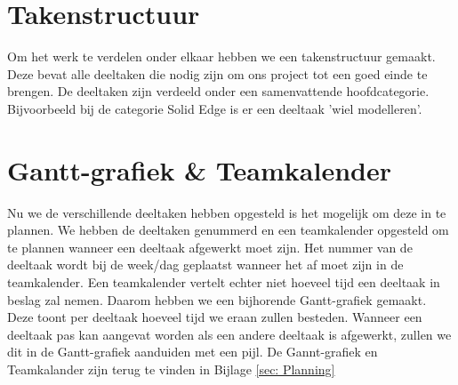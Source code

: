 \documentclass[a4paper,twoside,kulak]{kulakreport}
\begin{document}
	\section*{Takenstructuur}Om het werk te verdelen onder elkaar hebben we een takenstructuur gemaakt. Deze bevat alle deeltaken die nodig zijn om ons project tot een goed einde te brengen. De deeltaken zijn verdeeld onder een samenvattende hoofdcategorie. Bijvoorbeeld bij de categorie Solid Edge is er een deeltaak 'wiel modelleren'. 
	\section*{Gantt-grafiek \& Teamkalender} Nu we de verschillende deeltaken hebben opgesteld is het mogelijk om deze in te plannen. We hebben de deeltaken genummerd en een teamkalender opgesteld om te plannen wanneer een deeltaak afgewerkt moet zijn. Het nummer van de deeltaak wordt bij de week/dag geplaatst wanneer het af moet zijn in de teamkalender. Een teamkalender vertelt echter niet hoeveel tijd een deeltaak in beslag zal nemen. Daarom hebben we een bijhorende Gantt-grafiek gemaakt. Deze toont per deeltaak hoeveel tijd we eraan zullen besteden. Wanneer een deeltaak pas kan aangevat worden als een andere deeltaak is afgewerkt, zullen we dit in de Gantt-grafiek aanduiden met een pijl. De Gannt-grafiek en Teamkalander zijn terug te vinden in Bijlage \ref{sec: Planning} 
\end{document}
